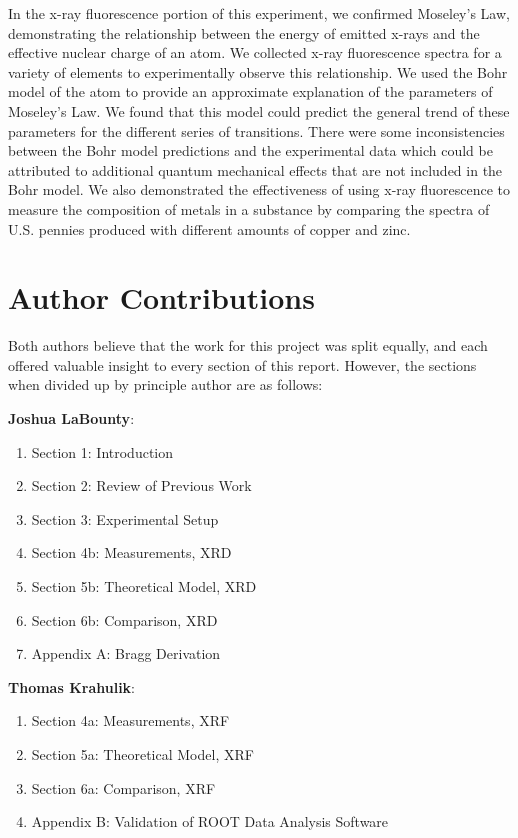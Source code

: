 \documentclass[%
 reprint,
 amsmath,amssymb,
 aps,
 pra,
]{revtex4-1}
\begin{document}
In the x-ray fluorescence portion of this experiment, we confirmed Moseley's Law, demonstrating the relationship between the energy of emitted x-rays and the effective nuclear charge of an atom. We collected x-ray fluorescence spectra for a variety of elements to experimentally observe this relationship. We used the Bohr model of the atom to provide an approximate explanation of the parameters of Moseley's Law. We found that this model could predict the general trend of these parameters for the different series of transitions. There were some inconsistencies between the Bohr model predictions and the experimental data which could be attributed to additional quantum mechanical effects that are not included in the Bohr model. We also demonstrated the effectiveness of using x-ray fluorescence to measure the composition of metals in a substance by comparing the spectra of U.S. pennies produced with different amounts of copper and zinc.

\section{Author Contributions}

Both authors believe that the work for this project was split equally, and each offered valuable insight to every section of this report. However, the sections when divided up by principle author are as follows:

\noindent \textbf{Joshua LaBounty}:
\begin{enumerate}
	\item Section 1: Introduction
	\item Section 2: Review of Previous Work
	\item Section 3: Experimental Setup
	\item Section 4b: Measurements, XRD
	\item Section 5b: Theoretical Model, XRD
	\item Section 6b: Comparison, XRD
	\item Appendix A: Bragg Derivation
\end{enumerate}

\noindent \textbf{Thomas Krahulik}:
\begin{enumerate}
	\item Section 4a: Measurements, XRF
	\item Section 5a: Theoretical Model, XRF
	\item Section 6a: Comparison, XRF
	\item Appendix B: Validation of ROOT Data Analysis Software
\end{enumerate}
\end{document}
